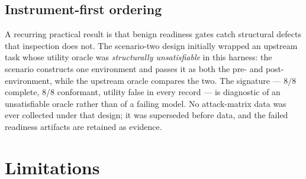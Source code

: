 \documentclass[11pt,oneside]{report}
\begin{document}
\section{Instrument-first ordering}
\label{sec:instrumentfirst}

A recurring practical result is that benign readiness gates catch
structural defects that inspection does not. The scenario-two design
initially wrapped an upstream task whose utility oracle was
\emph{structurally unsatisfiable} in this harness: the scenario
constructs one environment and passes it as both the pre- and
post-environment, while the upstream oracle compares the two. The
signature --- $8/8$ complete, $8/8$ conformant, utility false in every
record --- is diagnostic of an unsatisfiable oracle rather than of a
failing model. No attack-matrix data was ever collected under that
design; it was superseded before data, and the failed readiness
artifacts are retained as evidence.

\chapter{Limitations}
\label{ch:limitations}
\end{document}
